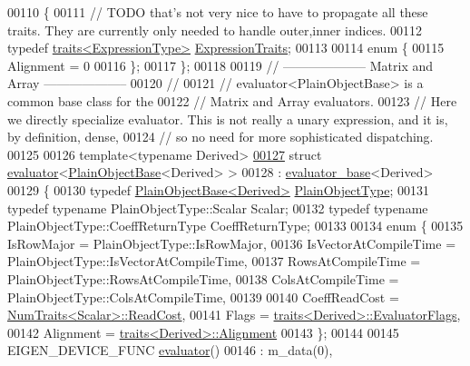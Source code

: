 \begin{DoxyCode}
00110 \{
00111   \textcolor{comment}{// TODO that's not very nice to have to propagate all these traits. They are currently only needed to
       handle outer,inner indices.}
00112   \textcolor{keyword}{typedef} \hyperlink{struct_eigen_1_1internal_1_1traits}{traits<ExpressionType>} \hyperlink{struct_eigen_1_1internal_1_1traits}{ExpressionTraits};
00113   
00114   \textcolor{keyword}{enum} \{
00115     Alignment = 0
00116   \};
00117 \};
00118 
00119 \textcolor{comment}{// -------------------- Matrix and Array --------------------}
00120 \textcolor{comment}{//}
00121 \textcolor{comment}{// evaluator<PlainObjectBase> is a common base class for the}
00122 \textcolor{comment}{// Matrix and Array evaluators.}
00123 \textcolor{comment}{// Here we directly specialize evaluator. This is not really a unary expression, and it is, by definition,
       dense,}
00124 \textcolor{comment}{// so no need for more sophisticated dispatching.}
00125 
00126 \textcolor{keyword}{template}<\textcolor{keyword}{typename} Derived>
\hyperlink{struct_eigen_1_1internal_1_1evaluator_3_01_plain_object_base_3_01_derived_01_4_01_4}{00127} \textcolor{keyword}{struct }\hyperlink{struct_eigen_1_1internal_1_1evaluator}{evaluator}<\hyperlink{class_eigen_1_1_plain_object_base}{PlainObjectBase}<Derived> >
00128   : \hyperlink{struct_eigen_1_1internal_1_1evaluator__base}{evaluator\_base}<Derived>
00129 \{
00130   \textcolor{keyword}{typedef} \hyperlink{class_eigen_1_1_plain_object_base}{PlainObjectBase<Derived>} \hyperlink{class_eigen_1_1_plain_object_base}{PlainObjectType};
00131   \textcolor{keyword}{typedef} \textcolor{keyword}{typename} PlainObjectType::Scalar Scalar;
00132   \textcolor{keyword}{typedef} \textcolor{keyword}{typename} PlainObjectType::CoeffReturnType CoeffReturnType;
00133 
00134   \textcolor{keyword}{enum} \{
00135     IsRowMajor = PlainObjectType::IsRowMajor,
00136     IsVectorAtCompileTime = PlainObjectType::IsVectorAtCompileTime,
00137     RowsAtCompileTime = PlainObjectType::RowsAtCompileTime,
00138     ColsAtCompileTime = PlainObjectType::ColsAtCompileTime,
00139     
00140     CoeffReadCost = \hyperlink{group___core___module_struct_eigen_1_1_num_traits}{NumTraits<Scalar>::ReadCost},
00141     Flags = \hyperlink{struct_eigen_1_1internal_1_1traits}{traits<Derived>::EvaluatorFlags},
00142     Alignment = \hyperlink{struct_eigen_1_1internal_1_1traits}{traits<Derived>::Alignment}
00143   \};
00144   
00145   EIGEN\_DEVICE\_FUNC \hyperlink{struct_eigen_1_1internal_1_1evaluator}{evaluator}()
00146     : m\_data(0),

\end{DoxyCode}
